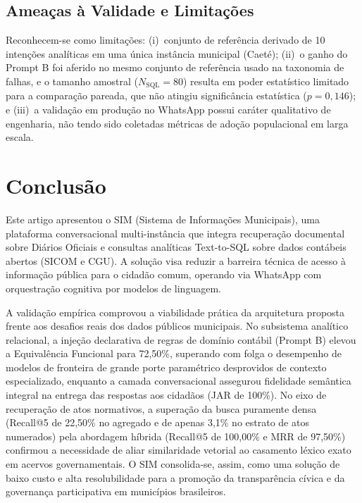 \documentclass[12pt]{article}
\begin{document}
\subsection{Ameaças à Validade e Limitações}

Reconhecem-se como limitações: (i)~conjunto de referência derivado de 10 intenções analíticas em uma única instância municipal (Caeté); (ii)~o ganho do Prompt B foi aferido no mesmo conjunto de referência usado na taxonomia de falhas, e o tamanho amostral ($N_{\text{SQL}} = 80$) resulta em poder estatístico limitado para a comparação pareada, que não atingiu significância estatística ($p = 0{,}146$); e (iii)~a validação em produção no WhatsApp possui caráter qualitativo de engenharia, não tendo sido coletadas métricas de adoção populacional em larga escala.

\section{Conclusão}

Este artigo apresentou o SIM (Sistema de Informações Municipais), uma plataforma conversacional multi-instância que integra recuperação documental sobre Diários Oficiais e consultas analíticas Text-to-SQL sobre dados contábeis abertos (SICOM e CGU). A solução visa reduzir a barreira técnica de acesso à informação pública para o cidadão comum, operando via WhatsApp com orquestração cognitiva por modelos de linguagem.

A validação empírica comprovou a viabilidade prática da arquitetura proposta frente aos desafios reais dos dados públicos municipais. No subsistema analítico relacional, a injeção declarativa de regras de domínio contábil (Prompt B) elevou a Equivalência Funcional para 72,50\%, superando com folga o desempenho de modelos de fronteira de grande porte paramétrico desprovidos de contexto especializado, enquanto a camada conversacional assegurou fidelidade semântica integral na entrega das respostas aos cidadãos (JAR de 100\%). No eixo de recuperação de atos normativos, a superação da busca puramente densa (Recall@5 de 22,50\% no agregado e de apenas 3,1\% no estrato de atos numerados) pela abordagem híbrida (Recall@5 de 100,00\% e MRR de 97,50\%) confirmou a necessidade de aliar similaridade vetorial ao casamento léxico exato em acervos governamentais. O SIM consolida-se, assim, como uma solução de baixo custo e alta resolubilidade para a promoção da transparência cívica e da governança participativa em municípios brasileiros.
\end{document}
